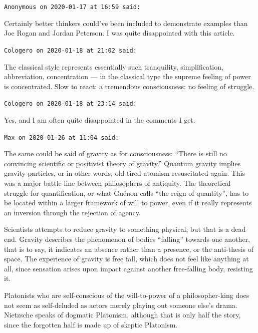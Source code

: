 \begin{footnotesize}
\begin{sffamily}
\texttt{Anonymous on 2020-01-17 at 16:59 said:}

Certainly better thinkers could've been included to demonstrate examples than Joe Rogan and Jordan Peterson. I was quite disappointed with this article.

\hfill

\texttt{Cologero on 2020-01-18 at 21:02 said:}

The classical style represents essentially such tranquility, simplification, abbreviation, concentration --- in the classical type the supreme feeling of power is concentrated. Slow to react: a tremendous consciousness: no feeling of struggle. 


\hfill

\texttt{Cologero on 2020-01-18 at 23:14 said:}

Yes, and I am often quite disappointed in the comments I get.

\hfill

\texttt{Max on 2020-01-26 at 11:04 said:}

The same could be said of gravity as for consciousness: ``There is still no convincing scientific or positivist theory of gravity.'' Quantum gravity implies gravity-particles, or in other words, old tired atomism resuscitated again. This was a major battle-line between philosophers of antiquity. The theoretical struggle for quantification, or what Guénon calls ``the reign of quantity'', has to be located within a larger framework of will to power, even if it really represents an inversion through the rejection of agency.

Scientists attempts to reduce gravity to something physical, but that is a dead end. Gravity describes the phenomenon of bodies ``falling'' towards one another, that is to say, it indicates an absence rather than a presence, or the anti-thesis of space. The experience of gravity is free fall, which does not feel like anything at all, since sensation arises upon impact against another free-falling body, resisting it.

Platonists who are self-conscious of the will-to-power of a philosopher-king does not seem as self-deluded as actors merely playing out someone else's drama. Nietzsche speaks of dogmatic Platonism, although that is only half the story, since the forgotten half is made up of skeptic Platonism.

\hfill

\end{sffamily}
\end{footnotesize}

